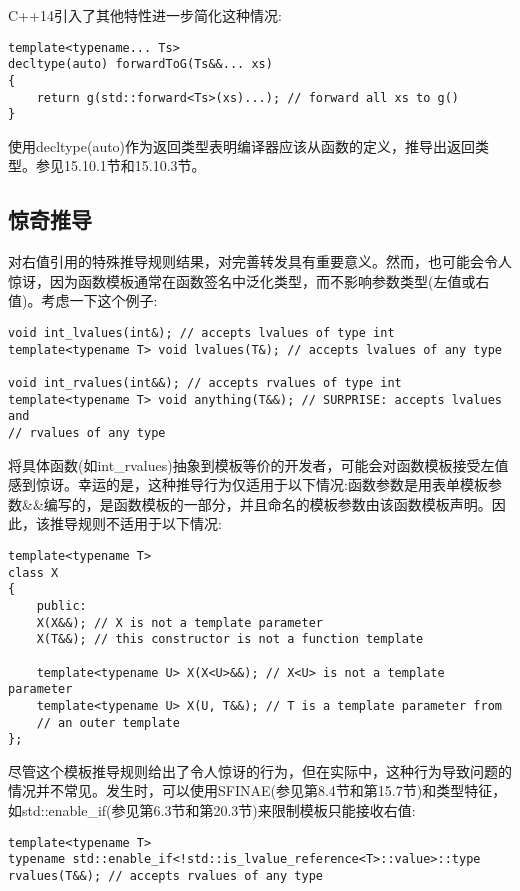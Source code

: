 C++14引入了其他特性进一步简化这种情况:

\begin{lstlisting}[style=styleCXX]
template<typename... Ts>
decltype(auto) forwardToG(Ts&&... xs)
{
	return g(std::forward<Ts>(xs)...); // forward all xs to g()
}
\end{lstlisting}

使用decltype(auto)作为返回类型表明编译器应该从函数的定义，推导出返回类型。参见15.10.1节和15.10.3节。

\subsection{惊奇推导}

对右值引用的特殊推导规则结果，对完善转发具有重要意义。然而，也可能会令人惊讶，因为函数模板通常在函数签名中泛化类型，而不影响参数类型(左值或右值)。考虑一下这个例子:

\begin{lstlisting}[style=styleCXX]
void int_lvalues(int&); // accepts lvalues of type int
template<typename T> void lvalues(T&); // accepts lvalues of any type

void int_rvalues(int&&); // accepts rvalues of type int
template<typename T> void anything(T&&); // SURPRISE: accepts lvalues and
// rvalues of any type
\end{lstlisting}

将具体函数(如int\_rvalues)抽象到模板等价的开发者，可能会对函数模板接受左值感到惊讶。幸运的是，这种推导行为仅适用于以下情况:函数参数是用表单模板参数\&\&编写的，是函数模板的一部分，并且命名的模板参数由该函数模板声明。因此，该推导规则不适用于以下情况:

\begin{lstlisting}[style=styleCXX]
template<typename T>
class X
{
	public:
	X(X&&); // X is not a template parameter
	X(T&&); // this constructor is not a function template
	
	template<typename U> X(X<U>&&); // X<U> is not a template parameter
	template<typename U> X(U, T&&); // T is a template parameter from
	// an outer template
};
\end{lstlisting}

尽管这个模板推导规则给出了令人惊讶的行为，但在实际中，这种行为导致问题的情况并不常见。发生时，可以使用SFINAE(参见第8.4节和第15.7节)和类型特征，如std::enable\_if(参见第6.3节和第20.3节)来限制模板只能接收右值:

\begin{lstlisting}[style=styleCXX]
template<typename T>
typename std::enable_if<!std::is_lvalue_reference<T>::value>::type
rvalues(T&&); // accepts rvalues of any type
\end{lstlisting}


























